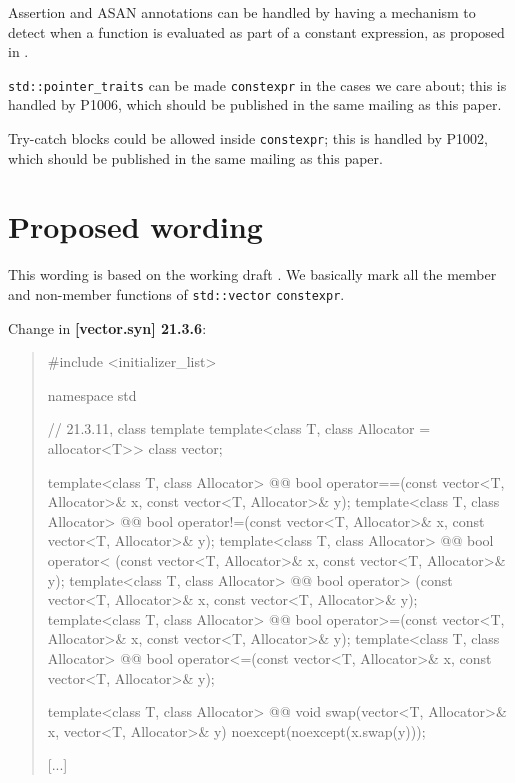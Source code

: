 \documentclass{wg21}
\newcommand{\cc}[1]{\texttt{#1}}
\begin{document}
Assertion and ASAN annotations can be handled by having a mechanism to detect
when a function is evaluated as part of a constant expression, as proposed in
\cite{P0595R0}.

\cc{std::pointer_traits} can be made \cc{constexpr} in the cases we care about;
this is handled by P1006, which should be published in the same mailing as this
paper.

Try-catch blocks could be allowed inside \cc{constexpr}; this is handled by
P1002, which should be published in the same mailing as this paper.


\section{Proposed wording}
This wording is based on the working draft \cite{N4727}. We basically mark
all the member and non-member functions of \cc{std::vector} \cc{constexpr}.

Change in \textbf{[vector.syn] 21.3.6}:
\begin{quote}
\begin{codeblock}
#include <initializer_list>

namespace std {
  // 21.3.11, class template 
  template<class T, class Allocator = allocator<T>> class vector;

  template<class T, class Allocator>
    @@ bool operator==(const vector<T, Allocator>& x, const vector<T, Allocator>& y);
  template<class T, class Allocator>
    @@ bool operator!=(const vector<T, Allocator>& x, const vector<T, Allocator>& y);
  template<class T, class Allocator>
    @@ bool operator< (const vector<T, Allocator>& x, const vector<T, Allocator>& y);
  template<class T, class Allocator>
    @@ bool operator> (const vector<T, Allocator>& x, const vector<T, Allocator>& y);
  template<class T, class Allocator>
    @@ bool operator>=(const vector<T, Allocator>& x, const vector<T, Allocator>& y);
  template<class T, class Allocator>
    @@ bool operator<=(const vector<T, Allocator>& x, const vector<T, Allocator>& y);

  template<class T, class Allocator>
    @@ void swap(vector<T, Allocator>& x, vector<T, Allocator>& y)
      noexcept(noexcept(x.swap(y)));

  [...]
}
\end{codeblock}
\end{quote}
\end{document}
